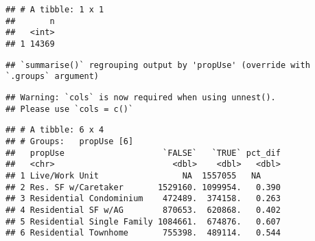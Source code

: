 \documentclass[]{article}
\newenvironment{Shaded}{\begin{snugshade}}{\end{snugshade}}
\newcommand{\DataTypeTok}[1]{\textcolor[rgb]{0.13,0.29,0.53}{#1}}
\newcommand{\DecValTok}[1]{\textcolor[rgb]{0.00,0.00,0.81}{#1}}
\newcommand{\KeywordTok}[1]{\textcolor[rgb]{0.13,0.29,0.53}{\textbf{#1}}}
\newcommand{\NormalTok}[1]{#1}
\newcommand{\OperatorTok}[1]{\textcolor[rgb]{0.81,0.36,0.00}{\textbf{#1}}}
\newcommand{\OtherTok}[1]{\textcolor[rgb]{0.56,0.35,0.01}{#1}}
\newcommand{\StringTok}[1]{\textcolor[rgb]{0.31,0.60,0.02}{#1}}
\begin{document}
\begin{Shaded}
\end{Shaded}

\begin{verbatim}
## # A tibble: 1 x 1
##       n
##   <int>
## 1 14369
\end{verbatim}

\begin{Shaded}
\end{Shaded}

\begin{verbatim}
## `summarise()` regrouping output by 'propUse' (override with `.groups` argument)
\end{verbatim}

\begin{verbatim}
## Warning: `cols` is now required when using unnest().
## Please use `cols = c()`
\end{verbatim}

\begin{verbatim}
## # A tibble: 6 x 4
## # Groups:   propUse [6]
##   propUse                    `FALSE`   `TRUE` pct_dif
##   <chr>                        <dbl>    <dbl>   <dbl>
## 1 Live/Work Unit                 NA  1557055   NA    
## 2 Res. SF w/Caretaker       1529160. 1099954.   0.390
## 3 Residential Condominium    472489.  374158.   0.263
## 4 Residential SF w/AG        870653.  620868.   0.402
## 5 Residential Single Family 1084661.  674876.   0.607
## 6 Residential Townhome       755398.  489114.   0.544
\end{verbatim}
\end{document}
